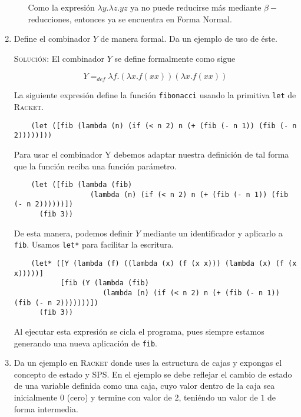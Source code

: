 \documentclass[letterpaper,11pt]{article}
\begin{document}
\begin{enumerate}
\begin{itemize}
        Como la expresión $\lambda y.\lambda z.yz$ ya no puede reducirse más 
        mediante $\beta -$reducciones, entonces ya se encuentra en Forma Normal.
    \end{itemize}

    \item Define el combinador $Y$ de manera formal. Da un ejemplo de uso de 
    éste.

    \textsc{Solución:} El combinador $Y$ se define formalmente como sigue 

    \begin{equation*}
        Y =_{def} \lambda f.(\lambda x.f (xx)) (\lambda x.f (xx))
    \end{equation*}

    La siguiente expresión define la función \texttt{fibonacci} usando la 
    primitiva \texttt{let} de \textsc{Racket}.
    \begin{verbatim}
    (let ([fib (lambda (n) (if (< n 2) n (+ (fib (- n 1)) (fib (- n 2)))))]))
    \end{verbatim}

    Para usar el combinador Y debemos adaptar nuestra definición de tal forma 
    que la función reciba una función parámetro.
    \begin{verbatim}
    (let ([fib (lambda (fib) 
                  (lambda (n) (if (< n 2) n (+ (fib (- n 1)) (fib (- n 2))))))])
      (fib 3))
    \end{verbatim}

    De esta manera, podemos definir $Y$ mediante un identificador y aplicarlo a 
    \texttt{fib}. Usamos \texttt{let*} para facilitar la escritura.
    \begin{verbatim}
    (let* ([Y (lambda (f) ((lambda (x) (f (x x))) (lambda (x) (f (x x)))))]
           [fib (Y (lambda (fib) 
                     (lambda (n) (if (< n 2) n (+ (fib (- n 1)) (fib (- n 2)))))))])
      (fib 3))
    \end{verbatim}

    Al ejecutar esta expresión se cicla el programa, pues siempre estamos 
    generando una nueva aplicación de \texttt{fib}. 

    \item Da un ejemplo en \textsc{Racket} donde uses la estructura de cajas y
    expongas el concepto de estado y SPS. En el ejemplo se debe reflejar el 
    cambio de estado de una variable definida como una caja, cuyo valor dentro 
    de la caja sea inicialmente $0$ (cero) y termine con valor de $2$, teniéndo 
    un valor de $1$ de forma intermedia.


\end{enumerate}
\end{document}
